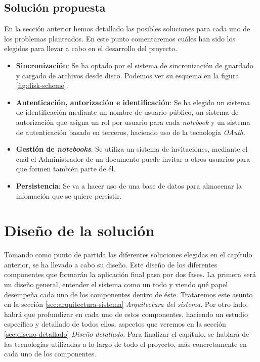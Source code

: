 \documentclass[11pt,spanish,listoffigures]{tfgetsinf}
\begin{document}

\section{Solución propuesta}
\label{sec:solucion-propuesta}

En la sección anterior hemos detallado las posibles soluciones para cada uno de los problemas planteados. En este punto comentaremos cuáles han sido los elegidos para llevar a cabo en el desarrollo del proyecto.

\begin{itemize}

\item \textbf{Sincronización}: Se ha optado por el sistema de sincronización de guardado y cargado de archivos desde disco. Podemos ver su esquema en la figura \ref{fig:disk-scheme}. 

\item \textbf{Autenticación, autorización e identificación}: Se ha elegido un sistema de identificación mediante un nombre de usuario público, un sistema de autorización que asigna un rol por usuario para cada \textit{notebook} y un sistema de autenticación basado en terceros, haciendo uso de la tecnología \textit{OAuth}.

\item \textbf{Gestión de \textit{notebooks}}: Se utiliza un sistema de invitaciones, mediante el cuál el Administrador de un documento puede invitar a otros usuarios para que formen también parte de él.

\item \textbf{Persistencia}: Se va a hacer uso de una base de datos para almacenar la infomación que se quiere persistir.

\end{itemize}





\chapter{Diseño de la solución}
\label{ch:diseno-solu}

Tomando como punto de partida las diferentes soluciones elegidas en el capítulo anterior, se ha llevado a cabo su diseño. Este diseño de los diferentes componentes que formarán la aplicación final pasa por dos fases. La primera será un diseño general, entender el sistema como un todo y viendo qué papel desempeña cada uno de los componentes dentro de éste. Trataremos este asunto en la sección \ref{sec:arquitectura-sistema} \textit{Arquitectura del sistema}. Por otro lado, habrá que profundizar en cada uno de estos componentes, haciendo un estudio específico y detallado de todos ellos, aspectos que veremos en la sección \ref{sec:diseno-detallado} \textit{Diseño detallado}. Para finalizar el capítulo, se hablará de las tecnologías utilizadas a lo largo de todo el proyecto, más concretamente en cada uno de los componentes.
\end{document}
